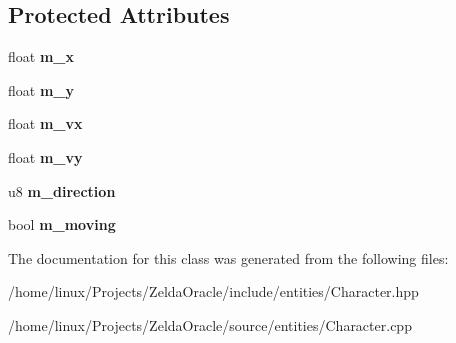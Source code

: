 \subsection*{Protected Attributes}
\begin{DoxyCompactItemize}
\item 
\hypertarget{classCharacter_ad0d297ed41044792f3144e98d361ef24}{float {\bfseries m\+\_\+x}}\label{classCharacter_ad0d297ed41044792f3144e98d361ef24}

\item 
\hypertarget{classCharacter_a7d65a136340c377b408808f9763a75a2}{float {\bfseries m\+\_\+y}}\label{classCharacter_a7d65a136340c377b408808f9763a75a2}

\item 
\hypertarget{classCharacter_a4cc303dcc38c81ac19c2820a60f5a33e}{float {\bfseries m\+\_\+vx}}\label{classCharacter_a4cc303dcc38c81ac19c2820a60f5a33e}

\item 
\hypertarget{classCharacter_ad173fd4b289f5c74ad81766cfc2ef2ac}{float {\bfseries m\+\_\+vy}}\label{classCharacter_ad173fd4b289f5c74ad81766cfc2ef2ac}

\item 
\hypertarget{classCharacter_a0e2c0871027ec614f2a7d4e283e9328f}{u8 {\bfseries m\+\_\+direction}}\label{classCharacter_a0e2c0871027ec614f2a7d4e283e9328f}

\item 
\hypertarget{classCharacter_aab07806fe827950f1b7a20be09b57ab9}{bool {\bfseries m\+\_\+moving}}\label{classCharacter_aab07806fe827950f1b7a20be09b57ab9}

\end{DoxyCompactItemize}


The documentation for this class was generated from the following files\+:\begin{DoxyCompactItemize}
\item 
/home/linux/\+Projects/\+Zelda\+Oracle/include/entities/Character.\+hpp\item 
/home/linux/\+Projects/\+Zelda\+Oracle/source/entities/Character.\+cpp\end{DoxyCompactItemize}
